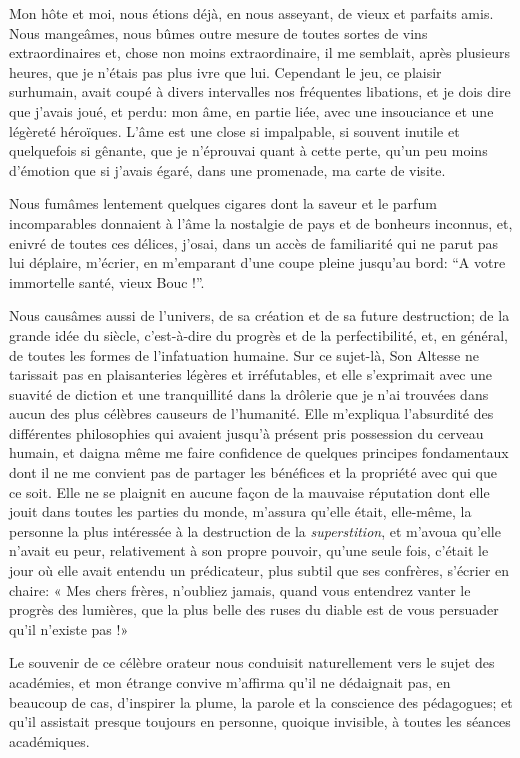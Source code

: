 Mon hôte et moi, nous étions déjà, en nous asseyant, de vieux et
parfaits amis. Nous mangeâmes, nous bûmes outre mesure de toutes sortes
de vins extraordinaires et, chose non moins extraordinaire, il me
semblait, après plusieurs heures, que je n’étais pas
plus ivre que lui. Cependant le jeu, ce plaisir surhumain, avait coupé
à divers intervalles nos fréquentes libations, et je dois dire que
j’avais joué, et perdu: mon âme, en partie liée, avec
une insouciance et une légèreté héroïques. L’âme est
une close si impalpable, si souvent inutile et quelquefois si gênante,
que je n’éprouvai quant à cette perte,
qu’un peu moins d’émotion que si
j’avais égaré, dans une promenade, ma carte de visite.

Nous fumâmes lentement quelques cigares dont la saveur et le parfum
incomparables donnaient à l’âme la nostalgie de pays
et de bonheurs inconnus, et, enivré de toutes ces délices,
j’osai, dans un accès de familiarité qui ne parut pas
lui déplaire, m’écrier, en m’emparant
d’une coupe pleine jusqu’au bord: ``A
votre immortelle santé, vieux Bouc !''.

Nous causâmes aussi de l’univers, de sa création et de
sa future destruction; de la grande idée du siècle,
c’est{}-à{}-dire du progrès et de la perfectibilité,
et, en général, de toutes les formes de l’infatuation
humaine. Sur ce sujet{}-là, Son Altesse ne tarissait pas en
plaisanteries légères et irréfutables, et elle
s’exprimait avec une suavité de diction et une
tranquillité dans la drôlerie que je n’ai trouvées
dans aucun des plus célèbres causeurs de l’humanité.
Elle m’expliqua l’absurdité des
différentes philosophies qui avaient jusqu’à présent
pris possession du cerveau humain, et daigna même me faire confidence
de quelques principes fondamentaux dont il ne me convient pas de
partager les bénéfices et la propriété avec qui que ce soit. Elle ne se
plaignit en aucune façon de la mauvaise réputation dont elle jouit dans
toutes les parties du monde, m’assura
qu’elle était, elle{}-même, la personne la plus
intéressée à la destruction de la \textit{superstition}, et
m’avoua qu’elle
n’avait eu peur, relativement à son propre pouvoir,
qu’une seule fois, c’était le jour où
elle avait entendu un prédicateur, plus subtil que ses confrères,
s’écrier en chaire: « Mes chers frères,
n’oubliez jamais, quand vous entendrez vanter le
progrès des lumières, que la plus belle des ruses du diable est de vous
persuader qu’il n’existe pas !»

Le souvenir de ce célèbre orateur nous conduisit naturellement vers le
sujet des académies, et mon étrange convive m’affirma
qu’il ne dédaignait pas, en beaucoup de cas,
d’inspirer la plume, la parole et la conscience des
pédagogues; et qu’il assistait presque toujours en
personne, quoique invisible, à toutes les séances académiques.

